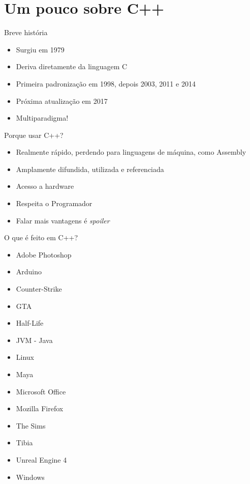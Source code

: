 \documentclass[11pt]{beamer}
\begin{document}
\section{Um pouco sobre C++}
	\begin{frame}{Breve história}
		\begin{itemize}
			\presentationPause\item Surgiu em 1979
			\presentationPause\item Deriva diretamente da linguagem C
			\presentationPause\item Primeira padronização em 1998, depois 2003, 2011 e 2014
			\presentationPause\item Próxima atualização em 2017
			\presentationPause\item Multiparadigma!
		\end{itemize}
	\end{frame}	

	\begin{frame}{Porque usar C++?}
		\begin{itemize}
			\presentationPause\item Realmente rápido, perdendo para linguagens de máquina, como Assembly
			\presentationPause\item Amplamente difundida, utilizada e referenciada
			\presentationPause\item Acesso a hardware
			\presentationPause\item Respeita o Programador
			\presentationPause\item Falar mais vantagens é \textit{spoiler}
		\end{itemize}
	\end{frame}

	\begin{frame}{O que é feito em C++?}
		\begin{multicols}{2}
			\begin{itemize}
				\presentationPause\item Adobe Photoshop
				\presentationPause\item Arduino
				\presentationPause\item Counter-Strike
				\presentationPause\item GTA
				\presentationPause\item Half-Life
				\presentationPause\item JVM - Java
				\presentationPause\item Linux
				\presentationPause\item Maya
				\presentationPause\item Microsoft Office
				\presentationPause\item Mozilla Firefox
				\presentationPause\item The Sims
				\presentationPause\item Tibia
				\presentationPause\item Unreal Engine 4
				\presentationPause\item Windows
			\end{itemize}		
		\end{multicols}
	\end{frame}
	
\end{document}
